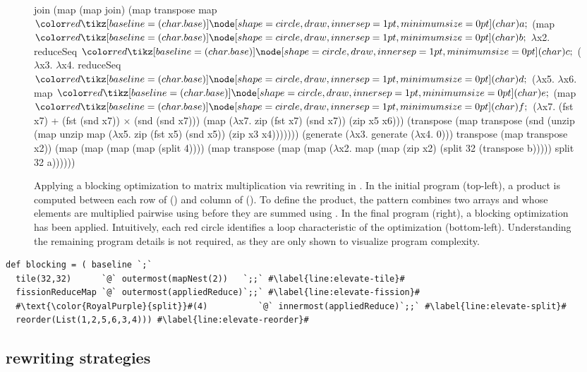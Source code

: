 \begin{figure}
\begin{minipage}[t]{0.5\linewidth}
\begin{rise}
join (map (map join) (map transpose
  map $\mydim{a}$ (map $\mydim{b}$ $\lambda$x2.
   reduceSeq $\mydim{c}$ ($\lambda$x3. $\lambda$x4.
     reduceSeq $\mydim{d}$ ($\lambda$x5. $\lambda$x6.
       map $\mydim{e}$ (map $\mydim{f}$ ($\lambda$x7. (fst x7) +
              (fst (snd x7)) $\times$
              (snd (snd x7)))
         (map ($\lambda$x7. zip (fst x7) (snd x7))
           (zip x5 x6)))
     (transpose (map transpose
       (snd (unzip (map unzip map ($\lambda$x5.
         zip (fst x5) (snd x5))
         (zip x3 x4)))))))
       (generate ($\lambda$x3. generate ($\lambda$x4. 0)))
       transpose (map transpose x2))
   (map (map (map (map (split 4))))
     (map transpose
       (map (map ($\lambda$x2. map (map (zip x2)
         (split 32 (transpose b)))))
           split 32 a))))))
\end{rise}
\end{minipage}
\caption{Applying a blocking optimization to matrix multiplication via rewriting in \Rise{}.
In the initial program (top-left), a  product is computed between each row of  () and column of  ().
To define the  product, the  pattern combines two arrays  and  whose elements are multiplied pairwise using  before they are summed using .
In the final program (right), a blocking optimization has been applied.
Intuitively, each red circle identifies a loop characteristic of the optimization (bottom-left).
Understanding the remaining program details is not required, as they are only shown to visualize program complexity.}
\label{fig:mm-rewrite}
\end{figure}

\begin{lstlisting}[float,style=elevate-rise,escapechar={\#}, caption={An \Elevate{} strategy that applies the blocking optimization to matrix multiplication \cite{hagedorn2020-elevate}},label=lst:elevate-blocking]
def blocking = ( baseline `;`
  tile(32,32)      `@` outermost(mapNest(2))   `;;` #\label{line:elevate-tile}#
  fissionReduceMap `@` outermost(appliedReduce)`;;` #\label{line:elevate-fission}#
  #\text{\color{RoyalPurple}{split}}#(4)          `@` innermost(appliedReduce)`;;` #\label{line:elevate-split}#
  reorder(List(1,2,5,6,3,4))) #\label{line:elevate-reorder}#
\end{lstlisting}

\subsection{\Elevate{} rewriting strategies}
\label{elevaterewrite}

